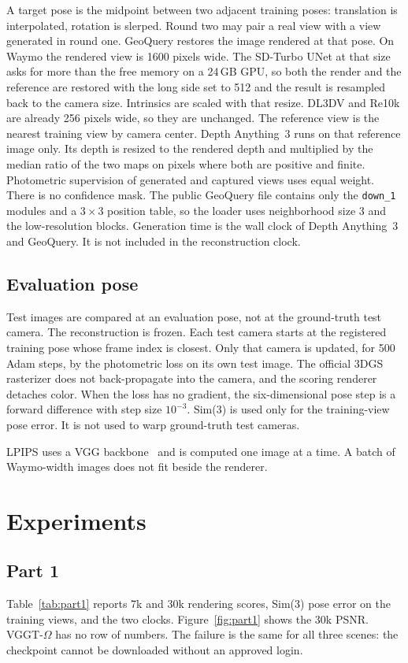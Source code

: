 \documentclass[10pt,twocolumn,letterpaper]{article}
\begin{document}
A target pose is the midpoint between two adjacent training poses: translation is interpolated, rotation is slerped.
Round two may pair a real view with a view generated in round one.
GeoQuery restores the image rendered at that pose.
On Waymo the rendered view is 1600 pixels wide.
The SD-Turbo UNet at that size asks for more than the free memory on a 24\,GB GPU, so both the render and the reference are restored with the long side set to 512 and the result is resampled back to the camera size.
Intrinsics are scaled with that resize.
DL3DV and Re10k are already 256 pixels wide, so they are unchanged.
The reference view is the nearest training view by camera center.
Depth Anything~3 runs on that reference image only.
Its depth is resized to the rendered depth and multiplied by the median ratio of the two maps on pixels where both are positive and finite.
Photometric supervision of generated and captured views uses equal weight.
There is no confidence mask.
The public GeoQuery file contains only the \texttt{down\_1} modules and a $3\times3$ position table, so the loader uses neighborhood size 3 and the low-resolution blocks.
Generation time is the wall clock of Depth Anything~3 and GeoQuery.
It is not included in the reconstruction clock.

\subsection{Evaluation pose}
Test images are compared at an evaluation pose, not at the ground-truth test camera.
The reconstruction is frozen.
Each test camera starts at the registered training pose whose frame index is closest.
Only that camera is updated, for 500 Adam steps, by the photometric loss on its own test image.
The official 3DGS rasterizer does not back-propagate into the camera, and the scoring renderer detaches color.
When the loss has no gradient, the six-dimensional pose step is a forward difference with step size $10^{-3}$.
Sim(3) is used only for the training-view pose error.
It is not used to warp ground-truth test cameras.

LPIPS uses a VGG backbone~\cite{zhang2018lpips} and is computed one image at a time.
A batch of Waymo-width images does not fit beside the renderer.

\section{Experiments}
\subsection{Part 1}
Table~\ref{tab:part1} reports 7k and 30k rendering scores, Sim(3) pose error on the training views, and the two clocks.
Figure~\ref{fig:part1} shows the 30k PSNR.
VGGT-$\Omega$ has no row of numbers.
The failure is the same for all three scenes: the checkpoint cannot be downloaded without an approved login.
\end{document}

